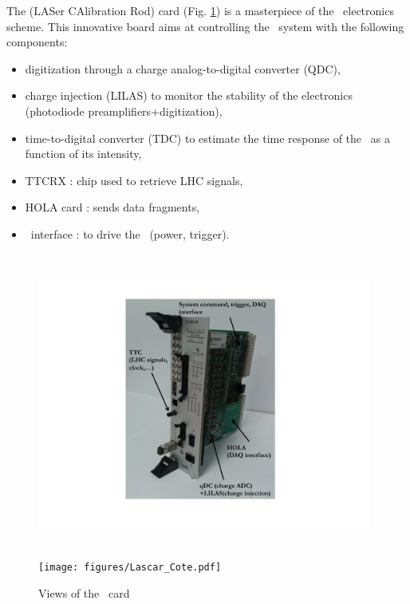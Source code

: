 The \lascar (LASer CAlibration Rod) card (Fig. \ref{fig:laslascar}) is a masterpiece of the \lasii~electronics scheme. This innovative board aims at controlling the \las~system with the following components:
\begin{itemize}

\item digitization through a charge analog-to-digital converter (QDC),

\item charge injection (LILAS) to monitor the stability of the electronics (photodiode preamplifiers+digitization),

\item time-to-digital converter (TDC) to estimate the time response of the \las~as a function of its intensity,

\item TTCRX : chip used to retrieve LHC signals,

\item HOLA card : sends data fragments,

\item \laser~interface : to drive the \las~(power, trigger).

\end{itemize}

\begin{figure}[htbp]

\centering
\includegraphics[height=10cm,width=11cm]{figures/Lascar_photo_black.pdf}
\texttt{[image: figures/Lascar\_Cote.pdf]}
\caption{Views of the \lascar~card}\label{fig:laslascar}
\end{figure}

